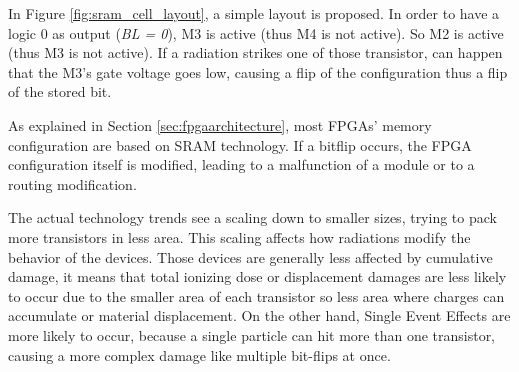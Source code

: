 In Figure \ref{fig:sram_cell_layout}, a simple layout is proposed. In order to have a logic 0 as output (\textit{BL = 0}), M3 is active (thus M4 is not active). So M2 is active (thus M3 is not active). If a radiation strikes one of those transistor, can happen that the M3's gate voltage goes low, causing a flip of the configuration thus a flip of the stored bit. \bigskip

As explained in Section \ref{sec:fpgaarchitecture}, most FPGAs' memory configuration are based on SRAM technology. If a bitflip occurs, the FPGA configuration itself is modified, leading to a malfunction of a module or to a routing modification.\bigskip

The actual technology trends see a scaling down to smaller sizes, trying to pack more transistors in less area. This scaling affects how radiations modify the behavior of the devices. Those devices are generally less affected by cumulative damage, it means that total ionizing dose or displacement damages are less likely to occur due to the smaller area of each transistor so less area where charges can accumulate or material displacement. On the other hand, Single Event Effects are more likely to occur, because a single particle can hit more than one transistor, causing a more complex damage like multiple bit-flips at once. 
